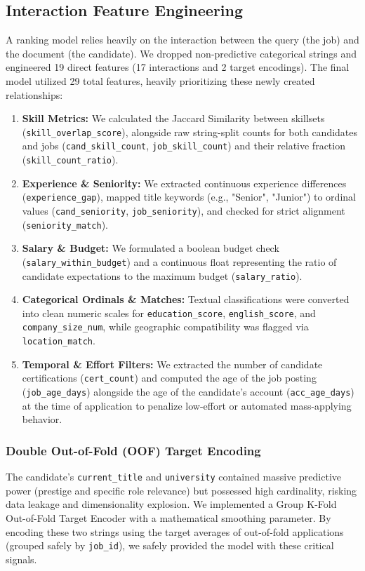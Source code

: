 \documentclass[a4paper,12pt]{extarticle}
\begin{document}
\subsection{Interaction Feature Engineering}
A ranking model relies heavily on the interaction between the query (the job) and the document (the candidate). We dropped non-predictive categorical strings and engineered 19 direct features (17 interactions and 2 target encodings). The final model utilized 29 total features, heavily prioritizing these newly created relationships:
\begin{enumerate}
    \item \textbf{Skill Metrics:} We calculated the Jaccard Similarity between skillsets (\texttt{skill\_overlap\_score}), alongside raw string-split counts for both candidates and jobs (\texttt{cand\_skill\_count}, \texttt{job\_skill\_count}) and their relative fraction (\texttt{skill\_count\_ratio}).
    \item \textbf{Experience \& Seniority:} We extracted continuous experience differences (\texttt{experience\_gap}), mapped title keywords (e.g., "Senior", "Junior") to ordinal values (\texttt{cand\_seniority}, \texttt{job\_seniority}), and checked for strict alignment (\texttt{seniority\_match}).
    \item \textbf{Salary \& Budget:} We formulated a boolean budget check (\texttt{salary\_within\_budget}) and a continuous float representing the ratio of candidate expectations to the maximum budget (\texttt{salary\_ratio}).
    \item \textbf{Categorical Ordinals \& Matches:} Textual classifications were converted into clean numeric scales for \texttt{education\_score}, \texttt{english\_score}, and \texttt{company\_size\_num}, while geographic compatibility was flagged via \texttt{location\_match}.
    \item \textbf{Temporal \& Effort Filters:} We extracted the number of candidate certifications (\texttt{cert\_count}) and computed the age of the job posting (\texttt{job\_age\_days}) alongside the age of the candidate's account (\texttt{acc\_age\_days}) at the time of application to penalize low-effort or automated mass-applying behavior.
\end{enumerate}

\subsubsection{Double Out-of-Fold (OOF) Target Encoding}
The candidate's \texttt{current\_title} and \texttt{university} contained massive predictive power (prestige and specific role relevance) but possessed high cardinality, risking data leakage and dimensionality explosion. We implemented a Group K-Fold Out-of-Fold Target Encoder with a mathematical smoothing parameter. By encoding these two strings using the target averages of out-of-fold applications (grouped safely by \texttt{job\_id}), we safely provided the model with these critical signals.
\end{document}
